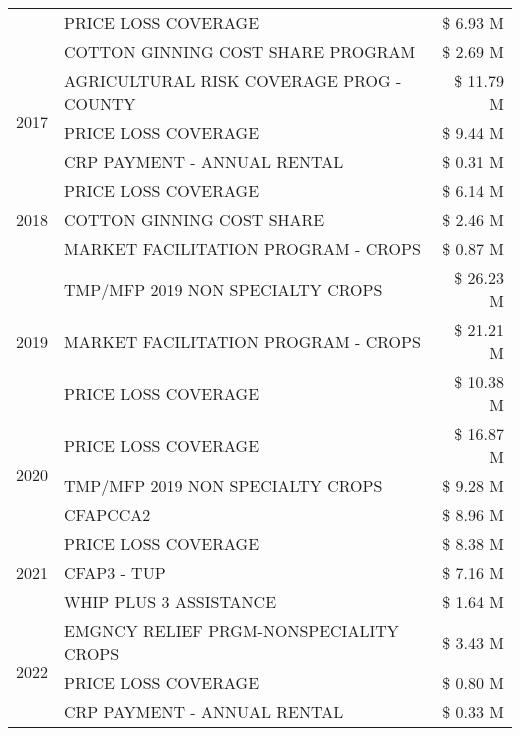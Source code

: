 \begin{tabular}{llr}
 & PRICE LOSS COVERAGE & \$ 6.93 M \\
 & COTTON GINNING COST SHARE PROGRAM & \$ 2.69 M \\
\cline{1-3}
\multirow[t]{3}{*}{2017} & AGRICULTURAL RISK COVERAGE PROG - COUNTY & \$ 11.79 M \\
 & PRICE LOSS COVERAGE & \$ 9.44 M \\
 & CRP PAYMENT - ANNUAL RENTAL & \$ 0.31 M \\
\cline{1-3}
\multirow[t]{3}{*}{2018} & PRICE LOSS COVERAGE & \$ 6.14 M \\
 & COTTON GINNING COST SHARE & \$ 2.46 M \\
 & MARKET FACILITATION PROGRAM - CROPS & \$ 0.87 M \\
\cline{1-3}
\multirow[t]{3}{*}{2019} & TMP/MFP 2019 NON SPECIALTY CROPS & \$ 26.23 M \\
 & MARKET FACILITATION PROGRAM - CROPS & \$ 21.21 M \\
 & PRICE LOSS COVERAGE & \$ 10.38 M \\
\cline{1-3}
\multirow[t]{3}{*}{2020} & PRICE LOSS COVERAGE & \$ 16.87 M \\
 & TMP/MFP 2019 NON SPECIALTY CROPS & \$ 9.28 M \\
 & CFAPCCA2 & \$ 8.96 M \\
\cline{1-3}
\multirow[t]{3}{*}{2021} & PRICE LOSS COVERAGE & \$ 8.38 M \\
 & CFAP3 - TUP & \$ 7.16 M \\
 & WHIP PLUS 3 ASSISTANCE & \$ 1.64 M \\
\cline{1-3}
\multirow[t]{3}{*}{2022} & EMGNCY RELIEF PRGM-NONSPECIALITY CROPS & \$ 3.43 M \\
 & PRICE LOSS COVERAGE & \$ 0.80 M \\
 & CRP PAYMENT - ANNUAL RENTAL & \$ 0.33 M \\
\cline{1-3}
\bottomrule
\end{tabular}
